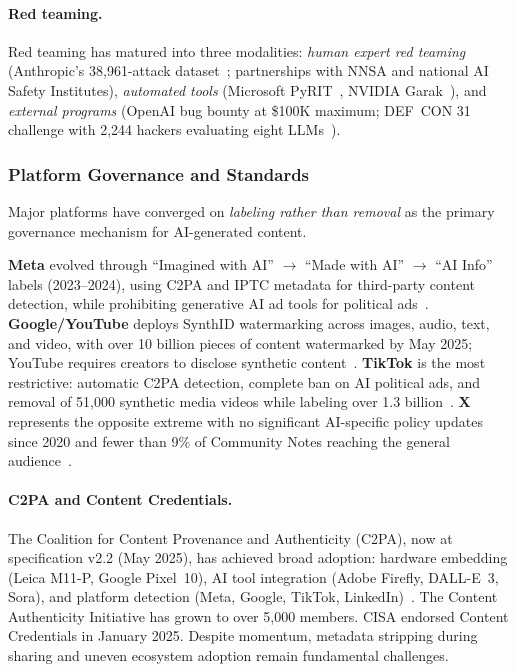 \paragraph{Red teaming.}
Red teaming has matured into three modalities: \emph{human expert red teaming} (Anthropic's 38,961-attack dataset~\cite{ganguli2022redteam}; partnerships with NNSA and national AI Safety Institutes), \emph{automated tools} (Microsoft PyRIT~\cite{pyrit2024}, NVIDIA Garak~\cite{garak2024}), and \emph{external programs} (OpenAI bug bounty at \$100K maximum; DEF~CON 31 challenge with 2,244 hackers evaluating eight LLMs~\cite{defcon2023generativeredteam}).


\subsubsection{Platform Governance and Standards}
\label{sec:gov-platform}

Major platforms have converged on \emph{labeling rather than removal} as the primary governance mechanism for AI-generated content.

\textbf{Meta} evolved through ``Imagined with AI'' $\to$ ``Made with AI'' $\to$ ``AI Info'' labels (2023--2024), using C2PA and IPTC metadata for third-party content detection, while prohibiting generative AI ad tools for political ads~\cite{metalabeling2024}. \textbf{Google/YouTube} deploys SynthID watermarking across images, audio, text, and video, with over 10 billion pieces of content watermarked by May 2025; YouTube requires creators to disclose synthetic content~\cite{synthid2025}. \textbf{TikTok} is the most restrictive: automatic C2PA detection, complete ban on AI political ads, and removal of 51,000 synthetic media videos while labeling over 1.3 billion~\cite{tiktok2023labels}. \textbf{X} represents the opposite extreme with no significant AI-specific policy updates since 2020 and fewer than 9\% of Community Notes reaching the general audience~\cite{xpolicy2020}.

\paragraph{C2PA and Content Credentials.}
The Coalition for Content Provenance and Authenticity (C2PA), now at specification v2.2 (May 2025), has achieved broad adoption: hardware embedding (Leica M11-P, Google Pixel~10), AI tool integration (Adobe Firefly, DALL-E~3, Sora), and platform detection (Meta, Google, TikTok, LinkedIn)~\cite{c2pa2025}. The Content Authenticity Initiative has grown to over 5,000 members. CISA endorsed Content Credentials in January 2025. Despite momentum, metadata stripping during sharing and uneven ecosystem adoption remain fundamental challenges.

